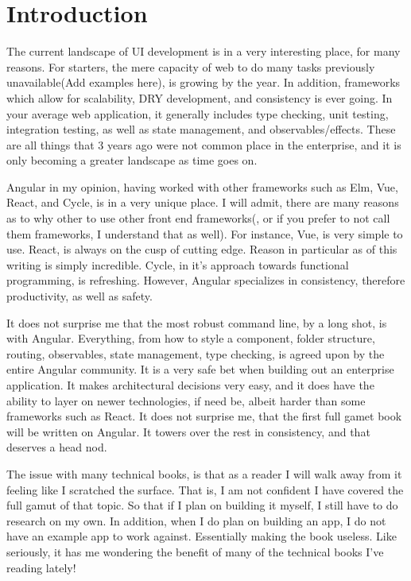 \maketitle{}
\section{Introduction}

The current landscape of UI development is in a very interesting place, for many
reasons. For starters, the mere capacity of web to do many tasks previously
unavailable(Add examples here), is growing by the year. In addition, frameworks
which allow for scalability, DRY development, and consistency is ever going. In
your average web application, it generally includes type checking, unit testing,
integration testing, as well as state management, and observables/effects. These
are all things that 3 years ago were not common place in the enterprise, and it
is only becoming a greater landscape as time goes on.

Angular in my opinion, having worked with other frameworks such as Elm, Vue,
React, and Cycle, is in a very unique place. I will admit, there are many
reasons as to why other to use other front end frameworks(, or if you prefer to
not call them frameworks, I understand that as well). For instance, Vue, is very
simple to use. React, is always on the cusp of cutting edge. Reason in
particular as of this writing is simply incredible. Cycle, in it's approach
towards functional programming, is refreshing. However, Angular specializes in
consistency, therefore productivity, as well as safety.

It does not surprise me that the most robust command line, by a long shot, is
with Angular. Everything, from how to style a component, folder structure,
routing, observables, state management, type checking, is agreed upon by the
entire Angular community. It is a very safe bet when building out an enterprise
application. It makes architectural decisions very easy, and it does have the
ability to layer on newer technologies, if need be, albeit harder than some
frameworks such as React. It does not surprise me, that the first full gamet
book will be written on Angular. It towers over the rest in consistency, and
that deserves a head nod.

The issue with many technical books, is that as a reader I will walk away from
it feeling like I scratched the surface. That is, I am not confident I have
covered the full gamut of that topic. So that if I plan on building it myself,
I still have to do research on my own. In addition, when I do plan on building
an app, I do not have an example app to work against. Essentially making the
book useless. Like seriously, it has me wondering the benefit of many of the
technical books I've reading lately!

